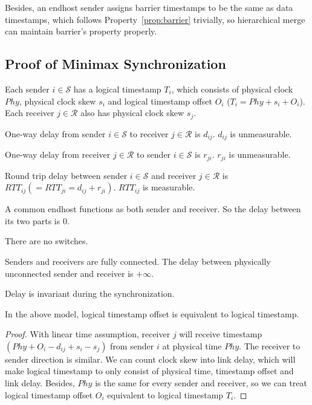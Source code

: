 Besides, an endhost sender assigns barrier timestamps to be the same as data timestamps, which follows Property~\ref{prop:barrier} trivially, so hierarchical merge can maintain barrier's property properly.
\subsection{Proof of Minimax Synchronization}
\label{appx:minimax}

\begin{notation}
	Each sender $i\in\mathcal{S}$ has a logical timestamp $T_i$, which consists of physical clock $Phy$, physical clock skew $s_i$ and logical timestamp offset $O_i$ ($T_i = Phy+s_i+O_i$).
	Each receiver $j \in \mathcal{R}$ also has physical clock skew $s_j$.
\end{notation}\begin{notation}
	One-way delay from sender $i \in \mathcal{S}$ to receiver $j \in \mathcal{R}$ is $d_{ij}$.
	$d_{ij}$ is unmeasurable.
\end{notation}
\begin{notation}
	One-way delay from receiver $j \in \mathcal{R}$ to sender $i \in \mathcal{S}$ is $r_{ji}$.
	$r_{ji}$ is unmeasurable.
\end{notation}
\begin{notation}
	Round trip delay between sender $i \in \mathcal{S}$ and receiver $j \in \mathcal{R}$ is $RTT_{ij}( = RTT_{ji} = d_{ij} + r_{ji})$.
	$RTT_{ij}$ is measurable.
\end{notation}
\begin{note}
	A common endhost functions as both sender and receiver.
	So the delay between its two parts is $0$.
\end{note}
\begin{assump}
	There are no switches.
\end{assump}
\begin{assump}
	Senders and receivers are fully connected.
	The delay between physically unconnected sender and receiver is $+\infty$.
\end{assump}
\begin{assump}
	Delay is invariant during the synchronization.
\end{assump}
\begin{lemma}\label{proof:ts2offset}
	In the above model, logical timestamp offset is equivalent to logical timestamp.
\end{lemma}
\begin{proof}
	With linear time assumption, receiver $j$ will receive timestamp $(Phy+O_i-d_{ij}+s_i-s_j)$ from sender $i$ at physical time $Phy$.
	The receiver to sender direction is similar.
	We can count clock skew into link delay, which will make logical timestamp to only consist of physical time, timestamp offset and link delay.
	Besides, $Phy$ is the same for every sender and receiver, so we can treat logical timestamp offset $O_i$ equivalent to logical timestamp $T_i$.
\end{proof}
